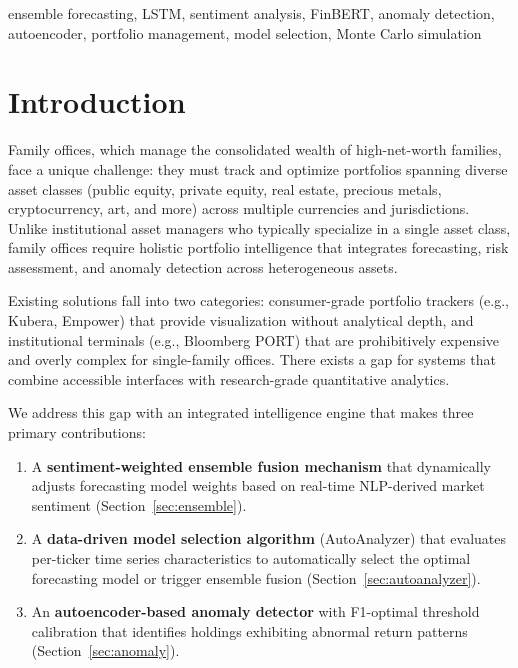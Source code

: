 \documentclass[conference]{IEEEtran}
\begin{document}
\begin{IEEEkeywords}
ensemble forecasting, LSTM, sentiment analysis, FinBERT, anomaly detection,
autoencoder, portfolio management, model selection, Monte Carlo simulation
\end{IEEEkeywords}

\section{Introduction}

Family offices, which manage the consolidated wealth of high-net-worth
families, face a unique challenge: they must track and optimize portfolios
spanning diverse asset classes (public equity, private equity, real estate,
precious metals, cryptocurrency, art, and more) across multiple currencies
and jurisdictions. Unlike institutional asset managers who typically
specialize in a single asset class, family offices require holistic
portfolio intelligence that integrates forecasting, risk assessment,
and anomaly detection across heterogeneous assets.

Existing solutions fall into two categories: consumer-grade portfolio
trackers (e.g., Kubera, Empower) that provide visualization without
analytical depth, and institutional terminals (e.g., Bloomberg PORT)
that are prohibitively expensive and overly complex for single-family
offices. There exists a gap for systems that combine accessible
interfaces with research-grade quantitative analytics.

We address this gap with an integrated intelligence engine that makes
three primary contributions:

\begin{enumerate}
    \item A \textbf{sentiment-weighted ensemble fusion mechanism} that
    dynamically adjusts forecasting model weights based on real-time
    NLP-derived market sentiment (Section~\ref{sec:ensemble}).
    
    \item A \textbf{data-driven model selection algorithm} (AutoAnalyzer)
    that evaluates per-ticker time series characteristics to automatically
    select the optimal forecasting model or trigger ensemble fusion
    (Section~\ref{sec:autoanalyzer}).
    
    \item An \textbf{autoencoder-based anomaly detector} with F1-optimal
    threshold calibration that identifies holdings exhibiting abnormal
    return patterns (Section~\ref{sec:anomaly}).
\end{enumerate}
\end{document}
